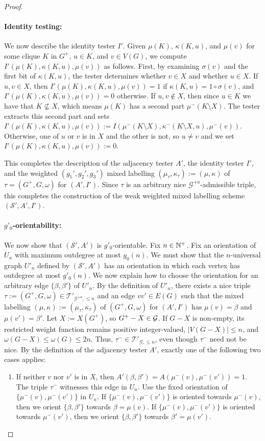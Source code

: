 \documentclass{patmorin}
\renewcommand{\le}{\leqslant}
\newcommand{\calG}{\mathcal{G}}
\newcommand{\calS}{\mathcal{S}}
\newcommand{\calT}{\mathcal{T}}
\begin{document}
\begin{proof}
  \paragraph{Identity testing:}
  We now describe the identity tester $I'$.
  Given $\mu(K)$, $\kappa(K,u)$, and $\mu(v)$ for some clique $K$ in $G^+$, $u\in K$, and $v\in V(G)$,
  we compute $I'(\mu(K),\kappa(K,u),\mu(v))$ as follows.
  First, by examining $\sigma(v)$ and the first bit of $\kappa(K,u)$, the tester determines whether $v\in X$ and whether $u\in X$.
  If $u,v\in X$, then $I'(\mu(K),\kappa(K,u),\mu(v))=1$ if $\kappa(K,u)=1\circ\sigma(v)$, and $I'(\mu(K),\kappa(K,u),\mu(v))=0$ otherwise.
  If $u,v\not\in X$, then since $u\in K$ we have that $K\not\subseteq X$, which means $\mu(K)$ has a second part $\mu^-(K\setminus X)$. The tester extracts this second part and sets
  $I'(\mu(K),\kappa(K,u),\mu(v)) := I(\mu^-(K\setminus X),\kappa^-(K\setminus X,u),\mu^-(v))$.
  Otherwise, one of $u$ or $v$ is in $X$ and the other is not, so $u\neq v$ and we set $I'(\mu(K),\kappa(K,u),\mu(v)) := 0$.

  This completes the description of the adjacency tester $A'$, the identity tester $I'$, and the weighted $(g_1',g_2',g_3')$ mixed labelling $(\mu_\tau,\kappa_\tau):=(\mu,\kappa)$ of $\tau=(G^+,G,\omega)$ for $(A',I')$. Since $\tau$ is an arbitrary nice $\calG^{+a}$-admissible triple, this completes the construction of the weak weighted mixed labelling scheme $(\calS',A',I')$.

  \paragraph{\boldmath $g'_0$-orientability:}
  We now show that $(\calS',A')$ is $g'_0$-orientable.  Fix $n\in\mathbb{N}^+$. Fix an orientation of $U_n$ with maximum outdegree at most $g_0(n)$.  We must show that the $n$-universal graph $U'_n$ defined by $(\calS',A')$ has an orientation in which each vertex has outdegree at most $g'_0(n)$.
  We now explain how to choose the orientation for an arbitrary edge $\{\beta,\beta'\}$ of $U'_n$.   By the definition of $U'_n$, there exists a nice triple $\tau:=(G^+,G,\omega) \in \calT'_{\calG^{+a},\le n}$ and an edge $vv'\in E(G)$ such that the mixed labelling $(\mu,\kappa):=(\mu_\tau,\kappa_\tau)$ of $(G^+,G,\omega)$ for $(A',I')$ has $\mu(v)=\beta$ and $\mu(v')=\beta'$.  Let $X:=X(G^+)$, so $G^+-X\in \cal{G}$. If $G-X$ is non-empty, its restricted weight function remains positive integer-valued, $|V(G-X)|\le n$, and $\omega(G-X)\le\omega(G)\le 2n$. Thus, $\tau^-\in\calT'_{\calG,\le n}$, even though $\tau^-$ need not be nice.  By the definition of the adjacency tester $A'$, exactly one of the following two cases applies:
  \begin{enumerate}
    \item If neither $v$ nor $v'$ is in $X$, then $A'(\beta,\beta')=A(\mu^-(v),\mu^-(v'))=1$.  The triple $\tau^-$ witnesses this edge in $U_n$. Use the fixed orientation of $\{\mu^-(v),\mu^-(v')\}$ in $U_n$. If $\{\mu^-(v),\mu^-(v')\}$ is oriented towards $\mu^-(v)$, then we orient $\{\beta,\beta'\}$ towards $\beta=\mu(v)$. If $\{\mu^-(v),\mu^-(v')\}$ is oriented towards $\mu^-(v')$, then we orient $\{\beta,\beta'\}$ towards $\beta'=\mu(v')$.


\end{enumerate}
\end{proof}
\end{document}

